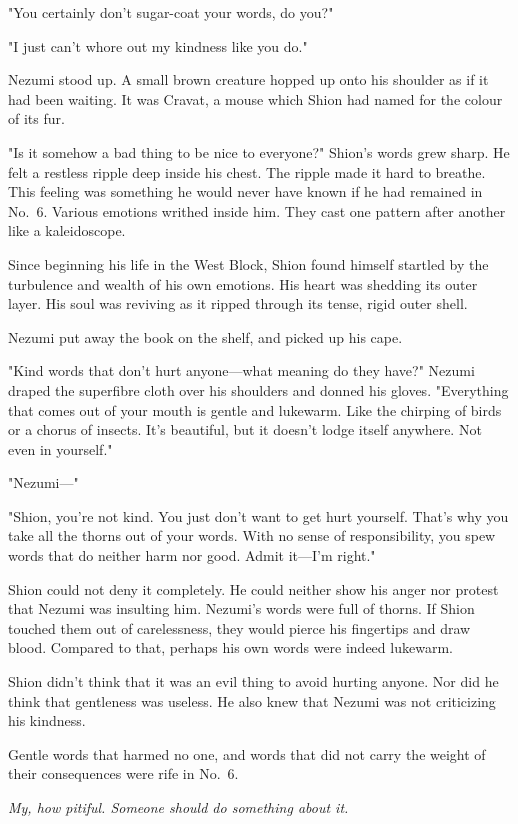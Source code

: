 "You certainly don't sugar-coat your words, do you?"

"I just can't whore out my kindness like you do."

Nezumi stood up. A small brown creature hopped up onto his shoulder as
if it had been waiting. It was Cravat, a mouse which Shion had named for
the colour of its fur.

"Is it somehow a bad thing to be nice to everyone?" Shion's words grew
sharp. He felt a restless ripple deep inside his chest. The ripple made
it hard to breathe. This feeling was something he would never have known
if he had remained in No.~6. Various emotions writhed inside him. They
cast one pattern after another like a kaleidoscope.

Since beginning his life in the West Block, Shion found himself startled
by the turbulence and wealth of his own emotions. His heart was shedding
its outer layer. His soul was reviving as it ripped through its tense,
rigid outer shell.

Nezumi put away the book on the shelf, and picked up his cape.

"Kind words that don't hurt anyone---what meaning do they have?" Nezumi
draped the superfibre cloth over his shoulders and donned his gloves.
"Everything that comes out of your mouth is gentle and lukewarm. Like
the chirping of birds or a chorus of insects. It's beautiful, but it
doesn't lodge itself anywhere. Not even in yourself."

"Nezumi---"

"Shion, you're not kind. You just don't want to get hurt yourself.
That's why you take all the thorns out of your words. With no sense of
responsibility, you spew words that do neither harm nor good. Admit
it---I'm right."

Shion could not deny it completely. He could neither show his anger nor
protest that Nezumi was insulting him. Nezumi's words were full of
thorns. If Shion touched them out of carelessness, they would pierce his
fingertips and draw blood. Compared to that, perhaps his own words were
indeed lukewarm.

Shion didn't think that it was an evil thing to avoid hurting anyone.
Nor did he think that gentleness was useless. He also knew that Nezumi
was not criticizing his kindness.

Gentle words that harmed no one, and words that did not carry the weight
of their consequences were rife in No.~6.

\emph{My, how pitiful. Someone should do something about it.}

